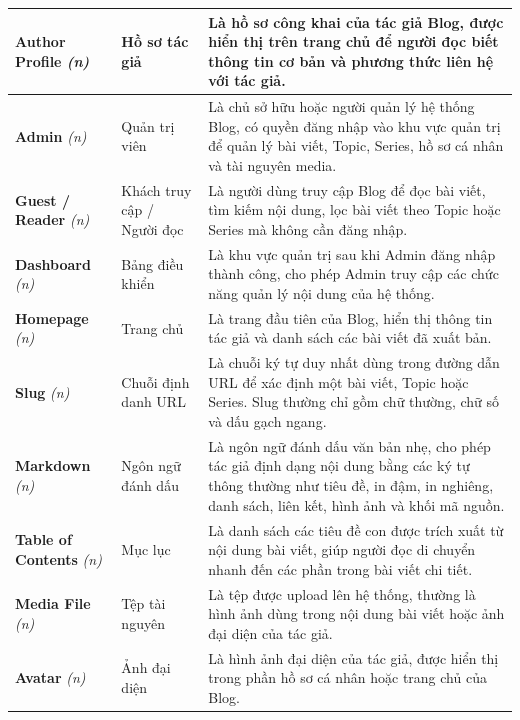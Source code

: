 \documentclass[a4paper,12pt]{article}
\begin{document}
\begin{longtable}{|p{3.5cm}|p{3.5cm}|p{8cm}|}
\textbf{Author Profile} \textit{(n)} & Hồ sơ tác giả & Là hồ sơ công khai của tác giả Blog, được hiển thị trên trang chủ để người đọc biết thông tin cơ bản và phương thức liên hệ với tác giả. \\
\hline

\textbf{Admin} \textit{(n)} & Quản trị viên & Là chủ sở hữu hoặc người quản lý hệ thống Blog, có quyền đăng nhập vào khu vực quản trị để quản lý bài viết, Topic, Series, hồ sơ cá nhân và tài nguyên media. \\
\hline

\textbf{Guest / Reader} \textit{(n)} & Khách truy cập / Người đọc & Là người dùng truy cập Blog để đọc bài viết, tìm kiếm nội dung, lọc bài viết theo Topic hoặc Series mà không cần đăng nhập. \\
\hline

\textbf{Dashboard} \textit{(n)} & Bảng điều khiển & Là khu vực quản trị sau khi Admin đăng nhập thành công, cho phép Admin truy cập các chức năng quản lý nội dung của hệ thống. \\
\hline

\textbf{Homepage} \textit{(n)} & Trang chủ & Là trang đầu tiên của Blog, hiển thị thông tin tác giả và danh sách các bài viết đã xuất bản. \\
\hline

\textbf{Slug} \textit{(n)} & Chuỗi định danh URL & Là chuỗi ký tự duy nhất dùng trong đường dẫn URL để xác định một bài viết, Topic hoặc Series. Slug thường chỉ gồm chữ thường, chữ số và dấu gạch ngang. \\
\hline

\textbf{Markdown} \textit{(n)} & Ngôn ngữ đánh dấu & Là ngôn ngữ đánh dấu văn bản nhẹ, cho phép tác giả định dạng nội dung bằng các ký tự thông thường như tiêu đề, in đậm, in nghiêng, danh sách, liên kết, hình ảnh và khối mã nguồn. \\
\hline

\textbf{Table of Contents} \textit{(n)} & Mục lục & Là danh sách các tiêu đề con được trích xuất từ nội dung bài viết, giúp người đọc di chuyển nhanh đến các phần trong bài viết chi tiết. \\
\hline

\textbf{Media File} \textit{(n)} & Tệp tài nguyên & Là tệp được upload lên hệ thống, thường là hình ảnh dùng trong nội dung bài viết hoặc ảnh đại diện của tác giả. \\
\hline

\textbf{Avatar} \textit{(n)} & Ảnh đại diện & Là hình ảnh đại diện của tác giả, được hiển thị trong phần hồ sơ cá nhân hoặc trang chủ của Blog. \\
\hline


\end{longtable}
\end{document}
